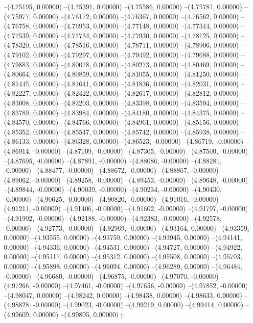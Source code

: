 --(4.75195, 0.00000)
--(4.75391, 0.00000)
--(4.75586, 0.00000)
--(4.75781, 0.00000)
--(4.75977, 0.00000)
--(4.76172, 0.00000)
--(4.76367, 0.00000)
--(4.76562, 0.00000)
--(4.76758, 0.00000)
--(4.76953, 0.00000)
--(4.77148, 0.00000)
--(4.77344, 0.00000)
--(4.77539, 0.00000)
--(4.77734, 0.00000)
--(4.77930, 0.00000)
--(4.78125, 0.00000)
--(4.78320, 0.00000)
--(4.78516, 0.00000)
--(4.78711, 0.00000)
--(4.78906, 0.00000)
--(4.79102, 0.00000)
--(4.79297, 0.00000)
--(4.79492, 0.00000)
--(4.79688, 0.00000)
--(4.79883, 0.00000)
--(4.80078, 0.00000)
--(4.80273, 0.00000)
--(4.80469, 0.00000)
--(4.80664, 0.00000)
--(4.80859, 0.00000)
--(4.81055, 0.00000)
--(4.81250, 0.00000)
--(4.81445, 0.00000)
--(4.81641, 0.00000)
--(4.81836, 0.00000)
--(4.82031, 0.00000)
--(4.82227, 0.00000)
--(4.82422, 0.00000)
--(4.82617, 0.00000)
--(4.82812, 0.00000)
--(4.83008, 0.00000)
--(4.83203, 0.00000)
--(4.83398, 0.00000)
--(4.83594, 0.00000)
--(4.83789, 0.00000)
--(4.83984, 0.00000)
--(4.84180, 0.00000)
--(4.84375, 0.00000)
--(4.84570, 0.00000)
--(4.84766, 0.00000)
--(4.84961, 0.00000)
--(4.85156, 0.00000)
--(4.85352, 0.00000)
--(4.85547, 0.00000)
--(4.85742, 0.00000)
--(4.85938, 0.00000)
--(4.86133, 0.00000)
--(4.86328, 0.00000)
--(4.86523, -0.00000)
--(4.86719, -0.00000)
--(4.86914, -0.00000)
--(4.87109, -0.00000)
--(4.87305, -0.00000)
--(4.87500, -0.00000)
--(4.87695, -0.00000)
--(4.87891, -0.00000)
--(4.88086, -0.00000)
--(4.88281, -0.00000)
--(4.88477, -0.00000)
--(4.88672, -0.00000)
--(4.88867, -0.00000)
--(4.89062, -0.00000)
--(4.89258, -0.00000)
--(4.89453, -0.00000)
--(4.89648, -0.00000)
--(4.89844, -0.00000)
--(4.90039, -0.00000)
--(4.90234, -0.00000)
--(4.90430, -0.00000)
--(4.90625, -0.00000)
--(4.90820, -0.00000)
--(4.91016, -0.00000)
--(4.91211, -0.00000)
--(4.91406, -0.00000)
--(4.91602, -0.00000)
--(4.91797, -0.00000)
--(4.91992, -0.00000)
--(4.92188, -0.00000)
--(4.92383, -0.00000)
--(4.92578, -0.00000)
--(4.92773, -0.00000)
--(4.92969, -0.00000)
--(4.93164, 0.00000)
--(4.93359, 0.00000)
--(4.93555, 0.00000)
--(4.93750, 0.00000)
--(4.93945, 0.00000)
--(4.94141, 0.00000)
--(4.94336, 0.00000)
--(4.94531, 0.00000)
--(4.94727, 0.00000)
--(4.94922, 0.00000)
--(4.95117, 0.00000)
--(4.95312, 0.00000)
--(4.95508, 0.00000)
--(4.95703, 0.00000)
--(4.95898, 0.00000)
--(4.96094, 0.00000)
--(4.96289, 0.00000)
--(4.96484, -0.00000)
--(4.96680, -0.00000)
--(4.96875, -0.00000)
--(4.97070, -0.00000)
--(4.97266, -0.00000)
--(4.97461, -0.00000)
--(4.97656, -0.00000)
--(4.97852, -0.00000)
--(4.98047, 0.00000)
--(4.98242, 0.00000)
--(4.98438, 0.00000)
--(4.98633, 0.00000)
--(4.98828, -0.00000)
--(4.99023, -0.00000)
--(4.99219, 0.00000)
--(4.99414, 0.00000)
--(4.99609, 0.00000)
--(4.99805, 0.00000)
;
